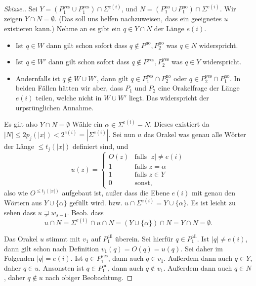 \documentclass[nofonts]{uebung}
\begin{document}
\begin{proof}[Skizze.]
    Sei $Y=(P^\mathrm{yes}_1\cup P^\mathrm{yes}_1)\cap\Sigma^{e(i)}$, und $N=(P^\mathrm{no}_1\cup P^\mathrm{no}_1)\cap\Sigma^{e(i)}$.
    Wir zeigen $Y\cap N = \emptyset$. (Das soll uns helfen nachzuweisen, dass ein geeignetes $u$ existieren kann.)
    Nehme an es gibt ein $q\in Y\cap N$ der Länge $e(i)$.
    \begin{itemize}[noitemsep]
        \item Ist $q\in W$ dann gilt schon sofort dass $q\not\in P^\mathrm{no}, P^\mathrm{no}_2$ was $q\in N$ widerspricht.
        \item Ist $q\in W'$ dann gilt schon sofort dass $q\not\in P^\mathrm{yes}, P^\mathrm{yes}_2$ was $q\in Y$ widerspricht.
        \item Andernfalls ist $q\not\in W\cup W'$, dann gilt $q\in P^\mathrm{yes}_1\cap P^\mathrm{no}_2$ oder $q\in P^\mathrm{yes}_2\cap P^\mathrm{no}_1$.
            In beiden Fällen hätten wir aber, dass $P_1$ und $P_2$ eine Orakelfrage der Länge $e(i)$ teilen, welche nicht in $W\cup W'$ liegt. Das widerspricht der urpsrünglichen Annahme.
    \end{itemize}

    Es gilt also $Y\cap N =\emptyset$ Wähle ein $\alpha\in \Sigma^{e(i)}-N$. Dieses existiert da $|N|\leq 2p_j(|x|)<2^{e(i)} = |\Sigma^{e(i)}|$.
    Sei nun $u$ das Orakel was genau alle Wörter der Länge $\leq t_j(|x|)$ definiert sind, und
    \[ u(z)= \begin{cases} O(z) & \text{falls $|z|\neq e(i)$}\\ 1 & \text{falls $z=\alpha$} \\ 1 & \text{falls $z\in Y$} \\ 0&\text{sonst,} \end{cases}
    \]
    also wie $O^{\leq t_j(|x|)}$ aufgebaut ist, außer dass die Ebene $e(i)$ mit genau den Wörtern aus $Y\cup \{\alpha\}$ gefüllt wird. bzw. $u\cap\Sigma^{e(i)} = Y\cup \{\alpha\}$.
    Es ist leicht zu sehen dass $u\sqsupsetneq w_{s-1}$.
    Beob. dass 
    \[ u\cap N = \Sigma^{e(i)}\cap u \cap N = (Y\cup \{\alpha\})\cap N = Y\cap N = \emptyset.\]

    Das Orakel $u$ stimmt mit $v_1$ auf $P^\mathrm{all}_1$ überein. Sei hierfür $q\in P^\mathrm{all}_1$.
    Ist $|q|\neq e(i)$, dann gilt schon nach Definition $v_1(q)=O(q)=u(q)$. Sei daher im Folgenden $|q|=e(i)$.
    Ist $q\in P^\mathrm{yes}_1$, dann auch $q\in v_1$. Außerdem dann auch $q\in Y$, daher $q\in u$.
    Ansonsten ist $q\in P^\mathrm{no}_1$, dann auch $q\not\in v_1$. Außerdem dann auch $q\in N$, daher $q\not\in u$ nach obiger Beobachtung.
    

\end{proof}
\end{document}
